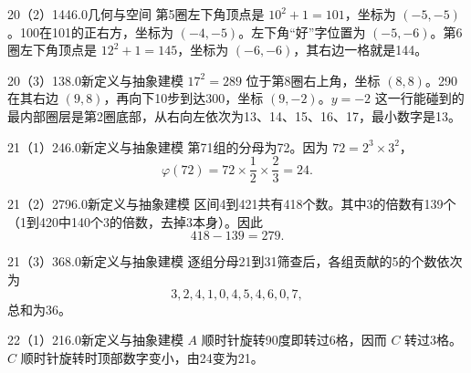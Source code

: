 \begin{solution}{20（2）}{144}{6.0}{几何与空间}
第5圈左下角顶点是 \(10^2+1=101\)，坐标为 \((-5,-5)\)。100在101的正右方，坐标为 \((-4,-5)\)。左下角“好”字位置为 \((-5,-6)\)。第6圈左下角顶点是 \(12^2+1=145\)，坐标为 \((-6,-6)\)，其右边一格就是144。
\end{solution}

\begin{solution}{20（3）}{13}{8.0}{新定义与抽象建模}
\(17^2=289\) 位于第8圈右上角，坐标 \((8,8)\)。290在其右边 \((9,8)\)，再向下10步到达300，坐标 \((9,-2)\)。\(y=-2\) 这一行能碰到的最内部圈层是第2圈底部，从右向左依次为13、14、15、16、17，最小数字是13。
\end{solution}

\begin{solution}{21（1）}{24}{6.0}{新定义与抽象建模}
第71组的分母为72。因为 \(72=2^3\times3^2\)，
\[
  \varphi(72)=72\times\frac12\times\frac23=24.
\]
\end{solution}

\begin{solution}{21（2）}{279}{6.0}{新定义与抽象建模}
区间4到421共有418个数。其中3的倍数有139个（1到420中140个3的倍数，去掉3本身）。因此
\[
  418-139=279.
\]
\end{solution}

\begin{solution}{21（3）}{36}{8.0}{新定义与抽象建模}
逐组分母21到31筛查后，各组贡献的5的个数依次为
\[
  3,2,4,1,0,4,5,4,6,0,7,
\]
总和为36。
\end{solution}

\begin{solution}{22（1）}{21}{6.0}{新定义与抽象建模}
\(A\) 顺时针旋转90度即转过6格，因而 \(C\) 转过3格。\(C\) 顺时针旋转时顶部数字变小，由24变为21。
\end{solution}

